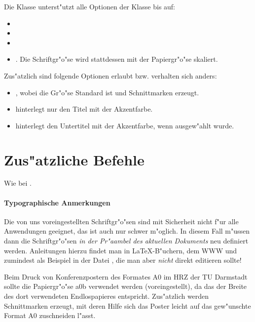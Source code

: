 \documentclass[twoside,colorback,accentcolor=tud4c,11pt]{tudreport}
\begin{document}
  Die Klasse  unterst"utzt alle Optionen der
   Klasse bis auf:
  \begin{itemize}\itemsep-0.5ex
     \item {}
     \item {}
     \item {}
     \item \textaccent{8pt 9.5pt 11pt 12pt}. Die Schriftgr"o"se wird stattdessen
       mit der Papiergr"o"se skaliert.
  \end{itemize}
  Zus"atzlich sind folgende Optionen erlaubt bzw. verhalten sich anders:
  \begin{itemize}\itemsep-0.5ex
    \item {}, wobei die Gr"o"se
       Standard ist und Schnittmarken erzeugt.
    \item {} hinterlegt nur den Titel mit der Akzentfarbe.
    \item {} hinterlegt den Untertitel mit der Akzentfarbe,
      wenn  ausgew"ahlt wurde.
  \end{itemize}
        
  \section{Zus"atzliche Befehle}
    Wie bei .
    

    \paragraph{Typographische Anmerkungen}
    Die von uns voreingestellten Schriftgr"o"sen sind mit Sicherheit nicht f"ur
    alle Anwendungen geeignet, das ist auch nur schwer m"oglich. In diesem
    Fall m"ussen dann die Schriftgr"o"sen \emph{in der Pr"aambel des aktuellen
    Dokuments} neu definiert werden. Anleitungen
    hierzu findet man in \LaTeX-B"uchern, dem WWW und zumindest als Beispiel
    in der Datei , die man aber \emph{nicht}
    direkt editieren sollte!

    Beim Druck von Konferenzpostern des Formates A0 im HRZ der TU Darmstadt sollte die
    Papiergr"o"se a0b verwendet werden (voreingestellt), da das der Breite des
    dort verwendeten Endlospapieres entspricht. Zus"atzlich werden
    Schnittmarken erzeugt, mit deren Hilfe sich das Poster leicht auf das
    gew"unschte Format A0 zuschneiden l"asst.
\end{document}
